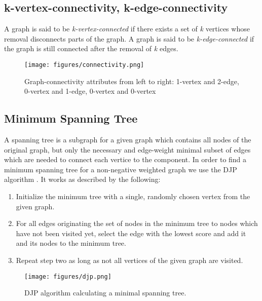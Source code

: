   \subsection{k-vertex-connectivity, k-edge-connectivity}
    A graph is said to be \textit{k-vertex-connected} if there exists a set of \textit{k} vertices whose removal disconnects parts of the graph.\newline
    A graph is said to be \textit{k-edge-connected} if the graph is still connected after the removal of \textit{k} edges.
    \begin{figure}[th!]
      \centering
      \texttt{[image: figures/connectivity.png]}
      \caption{Graph-connectivity attributes from left to right: 1-vertex and 2-edge, 0-vertex and 1-edge, 0-vertex and 0-vertex}
      \label{fig:connectivity}
    \end{figure}
    
  \subsection{Minimum Spanning Tree}
    A spanning tree is a subgraph for a given graph which contains all nodes of the original graph, but only the necessary and edge-weight minimal 
    subset of edges which are needed to connect each vertice to the component. In order to find a minimum spanning tree for a non-negative weighted 
    graph we use the DJP algorithm \cite{prim} \cite{jarnik}. It works as described by the following:
    
    \begin{enumerate}
     \item Initialize the minimum tree with a single, randomly chosen vertex from the given graph.
     
     \item For all edges originating the set of nodes in the minimum tree to nodes which have not been visited yet, 
      select the edge with the lowest score and add it and its nodes to the minimum tree.
      
     \item Repeat step two as long as not all vertices of the given graph are visited.
    \end{enumerate}
    
    \begin{figure}[th!]
      \centering
      \texttt{[image: figures/djp.png]}
      \caption{DJP algorithm calculating a minimal spanning tree.}
      \label{fig:djp}
    \end{figure}
    
